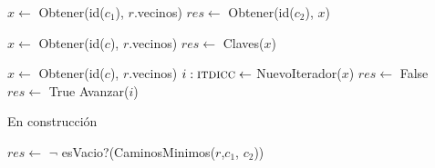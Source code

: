\begin{Algoritmos}
\begin{algorithm}
\begin{algorithmic}[1]
  \State $x \gets$ Obtener(id($c_1$), $r$.vecinos)
  \State $res \gets$ Obtener(id($c_2$), $x$)
 \EndProcedure
\end{algorithmic}


\begin{algorithmic}[1]
  \State $x \gets$ Obtener(id($c$), $r$.vecinos)
  \State $res \gets$ Claves($x$)
 \EndProcedure
\end{algorithmic}


\begin{algorithmic}[1]
  \State $x \gets$ Obtener(id($c$), $r$.vecinos)
  \State $i :\textsc{itdicc} \gets$ NuevoIterador($x$)
  \State $res \gets$ False
     $res \gets$ True  \EndIf
    \State Avanzar($i$)
  \EndWhile
 \EndProcedure
\end{algorithmic}



\begin{algorithmic}[1]
   \State En construcción 
\EndProcedure
\end{algorithmic}


\begin{algorithmic}[1]
   \State $res \gets$ $\neg$ esVacio?(CaminosMinimos($r$,$c_1$, $c_2$))
\EndProcedure
\end{algorithmic}


\end{algorithm}



\end{Algoritmos}







